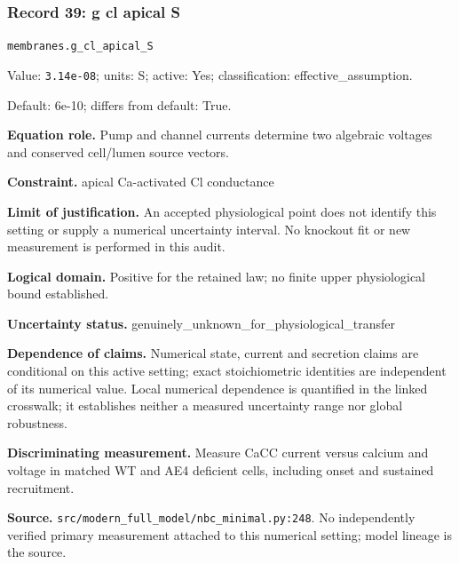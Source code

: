\subsubsection*{Record 39: g cl apical S}
{\small \nolinkurl{membranes.g_cl_apical_S}\par

Value: \texttt{3.14e-08}; units: S; active: Yes; classification: effective\_assumption.\par

Default: 6e-10; differs from default: True.\par

\textbf{Equation role.} Pump and channel currents determine two algebraic voltages and conserved cell/lumen source vectors.\par

\textbf{Constraint.} apical Ca-activated Cl conductance\par

\textbf{Limit of justification.} An accepted physiological point does not identify this setting or supply a numerical uncertainty interval. No knockout fit or new measurement is performed in this audit.\par

\textbf{Logical domain.} Positive for the retained law; no finite upper physiological bound established.\par

\textbf{Uncertainty status.} genuinely\_unknown\_for\_physiological\_transfer\par

\textbf{Dependence of claims.} Numerical state, current and secretion claims are conditional on this active setting; exact stoichiometric identities are independent of its numerical value. Local numerical dependence is quantified in the linked crosswalk; it establishes neither a measured uncertainty range nor global robustness.\par

\textbf{Discriminating measurement.} Measure CaCC current versus calcium and voltage in matched WT and AE4 deficient cells, including onset and sustained recruitment.\par

\textbf{Source.} \nolinkurl{src/modern_full_model/nbc_minimal.py:248}. No independently verified primary measurement attached to this numerical setting; model lineage is the source.\par}

